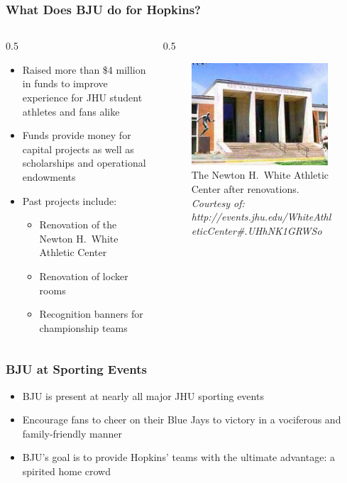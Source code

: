 \documentclass[compress,handout,10pt]{beamer}
\let\olditem\item
\renewcommand{\item}{\setlength{\itemsep}{0.5\baselineskip}\olditem}
\begin{document}
\begin{frame}
	\frametitle{What Does BJU do for Hopkins?}
	\begin {columns}
		\begin {column} {0.5\textwidth}
			\begin {itemize}
				\item Raised more than \$4 million in funds to improve experience for JHU student athletes and fans alike \cite{bjuwebsite}
				\item Funds provide money for capital projects as well as scholarships and operational endowments \cite{bjuwebsite}
				\item Past projects include:
				\begin{itemize}
					\item Renovation of the Newton H.~White Athletic Center \cite{bjuwebsite}
					\item Renovation of locker rooms \cite{bjuwebsite}
					\item Recognition banners for championship teams \cite{bjuwebsite}
				\end{itemize}
			\end {itemize}
		\end {column}
		\begin{column} {0.5\textwidth}
			\begin{figure}
			\begin{center}
				\includegraphics [width=2in] {AthleticCenter.jpg}
				\caption{{\tiny The Newton H.~White Athletic Center after renovations. \textit{Courtesy of: http://events.jhu.edu/WhiteAthleticCenter\#.UHhNK1GRWSo}}}
			\end{center}
			\end {figure}
		\end {column}
	\end {columns}
\end {frame}   

\begin{frame}
    \frametitle{BJU at Sporting Events}
    \begin{itemize}
    	\item BJU is present at nearly all major JHU sporting events
    	\item Encourage fans to cheer on their Blue Jays to victory in a vociferous and family-friendly manner
    	\item BJU's goal is to provide Hopkins' teams with the ultimate advantage: a spirited home crowd
    \end{itemize}
\end{frame}
\end{document}
